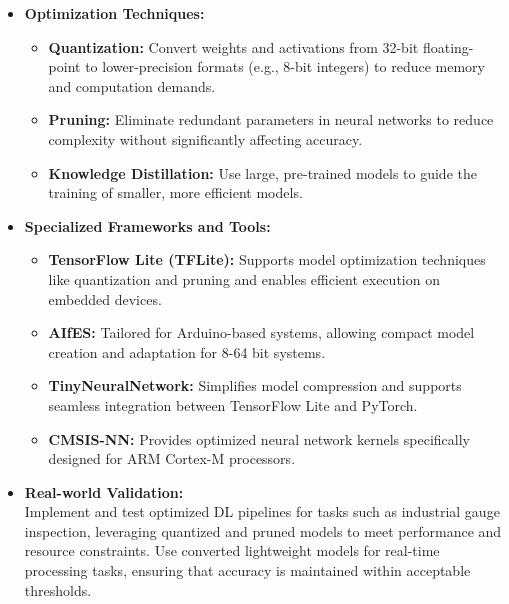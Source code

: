     \begin{itemize}
        \item \textbf{Optimization Techniques:}
        \begin{itemize}
            \item \textbf{Quantization:} Convert weights and activations from 32-bit floating-point to lower-precision formats (e.g., 8-bit integers) to reduce memory and computation demands.
            \item \textbf{Pruning:} Eliminate redundant parameters in neural networks to reduce complexity without significantly affecting accuracy.
            \item \textbf{Knowledge Distillation:} Use large, pre-trained models to guide the training of smaller, more efficient models.\cite{Maciel:2023}
        \end{itemize}
        
        \item \textbf{Specialized Frameworks and Tools:}
        \begin{itemize}
            \item \textbf{TensorFlow Lite (TFLite):} Supports model optimization techniques like quantization and pruning and enables efficient execution on embedded devices.\cite{Kristian:2020}
            \item \textbf{AIfES:} Tailored for Arduino-based systems, allowing compact model creation and adaptation for 8-64 bit systems.
            \item \textbf{TinyNeuralNetwork:} Simplifies model compression and supports seamless integration between TensorFlow Lite and PyTorch.
            \item \textbf{CMSIS-NN:} Provides optimized neural network kernels specifically designed for ARM Cortex-M processors.\cite{Kristian:2020}
        \end{itemize}
        
        \item \textbf{Real-world Validation:} \\
        Implement and test optimized DL pipelines for tasks such as industrial gauge inspection, leveraging quantized and pruned models to meet performance and resource constraints. Use converted lightweight models for real-time processing tasks, ensuring that accuracy is maintained within acceptable thresholds.\cite{Kristian:2020}
    \end{itemize}
    
